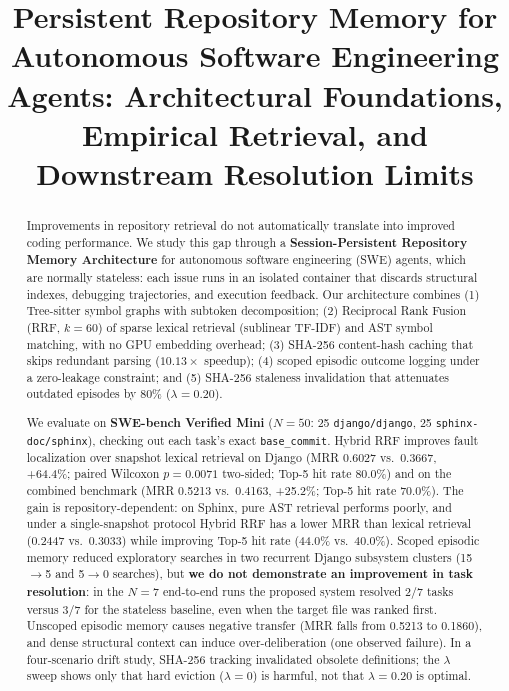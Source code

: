 \documentclass[conference]{IEEEtran}
\begin{document}
\title{Persistent Repository Memory for Autonomous Software Engineering Agents: Architectural Foundations, Empirical Retrieval, and Downstream Resolution Limits}

\author{
}

\maketitle

\begin{abstract}
Improvements in repository retrieval do not automatically translate into improved coding performance. We study this gap through a \textbf{Session-Persistent Repository Memory Architecture} for autonomous software engineering (SWE) agents, which are normally stateless: each issue runs in an isolated container that discards structural indexes, debugging trajectories, and execution feedback. Our architecture combines (1) Tree-sitter symbol graphs with subtoken decomposition; (2) Reciprocal Rank Fusion (RRF, $k=60$) of sparse lexical retrieval (sublinear TF-IDF) and AST symbol matching, with no GPU embedding overhead; (3) SHA-256 content-hash caching that skips redundant parsing ($10.13\times$ speedup); (4) scoped episodic outcome logging under a zero-leakage constraint; and (5) SHA-256 staleness invalidation that attenuates outdated episodes by 80\% ($\lambda=0.20$).

We evaluate on \textbf{SWE-bench Verified Mini} ($N=50$: 25 \texttt{django/django}, 25 \texttt{sphinx-doc/sphinx}), checking out each task's exact \texttt{base\_commit}. Hybrid RRF improves fault localization over snapshot lexical retrieval on Django (MRR 0.6027 vs.\ 0.3667, +64.4\%; paired Wilcoxon $p=0.0071$ two-sided; Top-5 hit rate 80.0\%) and on the combined benchmark (MRR 0.5213 vs.\ 0.4163, +25.2\%; Top-5 hit rate 70.0\%). The gain is repository-dependent: on Sphinx, pure AST retrieval performs poorly, and under a single-snapshot protocol Hybrid RRF has a lower MRR than lexical retrieval (0.2447 vs.\ 0.3033) while improving Top-5 hit rate (44.0\% vs.\ 40.0\%). Scoped episodic memory reduced exploratory searches in two recurrent Django subsystem clusters (15$\to$5 and 5$\to$0 searches), but \textbf{we do not demonstrate an improvement in task resolution}: in the $N=7$ end-to-end runs the proposed system resolved 2/7 tasks versus 3/7 for the stateless baseline, even when the target file was ranked first. Unscoped episodic memory causes negative transfer (MRR falls from 0.5213 to 0.1860), and dense structural context can induce over-deliberation (one observed failure). In a four-scenario drift study, SHA-256 tracking invalidated obsolete definitions; the $\lambda$ sweep shows only that hard eviction ($\lambda=0$) is harmful, not that $\lambda=0.20$ is optimal.
\end{abstract}
\end{document}
